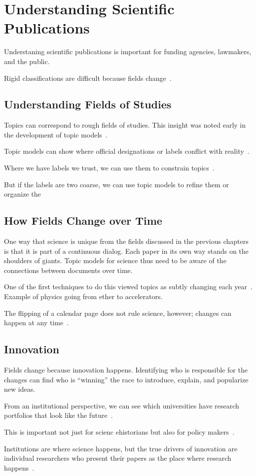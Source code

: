 

\chapter{Understanding Scientific Publications}
\label{ch:sci}

Understaning scientific publications is important for funding
agencies, lawmakers, and the public.

Rigid classifications are difficult because fields
change~\cite{szostak-04}.

\section{Understanding Fields of Studies}

Topics can correspond to rough fields of studies.  This insight was
noted early in the development of topic models~\cite{griffiths-04}.

Topic models can show where official designations or labels conflict
with reality~\cite{talley-11}.

Where we have labels we trust, we can use them to constrain
topics~\cite{ramage-09}.

But if the labels are two coarse, we can use topic models to refine
them or organize the\cite{Nguyen:Boyd-Graber:Resnik:Chang-2014}

\section{How Fields Change over Time}

One way that science is unique from the fields discussed in the
previous chapters is that it is part of a continuous dialog.  Each
paper in its own way stands on the shoulders of giants. Topic models
for science thus need to be aware of the connections between documents
over time.

One of the first techniques to do this viewed topics as subtly
changing each year~\cite{blei-06b}.  Example of physics going from
ether to accelerators.

The flipping of a calendar page does not rule science, however;
changes can happen at any time~\cite{wang-06,wang-08}.

\section{Innovation}

Fields change because innovation happens.  Identifying who is
responsible for the changes can find who is ``winning'' the race to
introduce, explain, and popularize new ideas.

From an institutional perspective, we can see which universities have
research portfolios that look like the future~\cite{ramage-10}.

This is important not just for scienc ehistorians but also for policy
makers~\cite{largent-12}.

Institutions are where science happens, but the true drivers of
innovation are individual researchers who present their papers as the
place where research happens~\cite{gerrish-10}.

